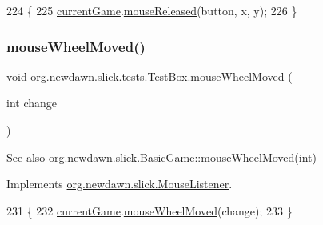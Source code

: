 \begin{DoxyCode}
224                                                         \{
225         \mbox{\hyperlink{classorg_1_1newdawn_1_1slick_1_1tests_1_1_test_box_a5e0fdb2f97173d828af597044c525078}{currentGame}}.\mbox{\hyperlink{classorg_1_1newdawn_1_1slick_1_1_basic_game_ad5f3b68d103dc42613e5a35c7f820f72}{mouseReleased}}(button, x, y);
226     \}
\end{DoxyCode}
\mbox{\label{classorg_1_1newdawn_1_1slick_1_1tests_1_1_test_box_a60b5186b990f70fcd47d459a75e80eb5}} 
\subsubsection{\texorpdfstring{mouse\+Wheel\+Moved()}{mouseWheelMoved()}}
{\footnotesize\ttfamily void org.\+newdawn.\+slick.\+tests.\+Test\+Box.\+mouse\+Wheel\+Moved (\begin{DoxyParamCaption}\item[{int}]{change }\end{DoxyParamCaption})\hspace{0.3cm}{\ttfamily [inline]}}

\begin{DoxySeeAlso}{See also}
\mbox{\hyperlink{classorg_1_1newdawn_1_1slick_1_1_basic_game_a28f0cdd4678843d738312a0fa49d5cc3}{org.\+newdawn.\+slick.\+Basic\+Game\+::mouse\+Wheel\+Moved(int)}} 
\end{DoxySeeAlso}


Implements \mbox{\hyperlink{interfaceorg_1_1newdawn_1_1slick_1_1_mouse_listener_ad7e49c969e1f0315ecdf238f715953d1}{org.\+newdawn.\+slick.\+Mouse\+Listener}}.


\begin{DoxyCode}
231                                             \{
232         \mbox{\hyperlink{classorg_1_1newdawn_1_1slick_1_1tests_1_1_test_box_a5e0fdb2f97173d828af597044c525078}{currentGame}}.\mbox{\hyperlink{classorg_1_1newdawn_1_1slick_1_1_basic_game_a28f0cdd4678843d738312a0fa49d5cc3}{mouseWheelMoved}}(change);
233     \}
\end{DoxyCode}
\mbox{\label{classorg_1_1newdawn_1_1slick_1_1tests_1_1_test_box_ad4155fd01658dadab9faef499d5db7d3}} 
